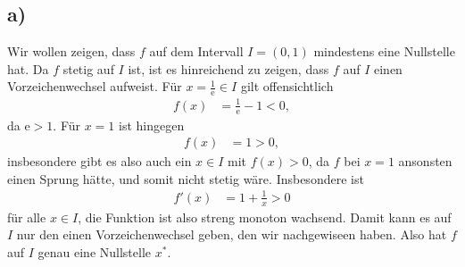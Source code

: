 \documentclass[english, parskip=full]{scrartcl}
\newcommand{\e}{\text{e}}
\begin{document}
\subsection*{a)}
Wir wollen zeigen, dass $f$ auf dem Intervall $I=(0,1)$ mindestens eine Nullstelle hat.
Da $f$ stetig auf $I$ ist, ist es hinreichend zu zeigen, dass $f$ auf $I$ einen Vorzeichenwechsel aufweist.
Für $x=\frac{1}{\e} \in I$ gilt offensichtlich 
\begin{align}
f(x) &= \frac{1}{\e} - 1 < 0,
\end{align}
da $\e > 1$. 
Für $x=1$ ist hingegen
\begin{align}
f(x) &= 1 > 0,
\end{align}
insbesondere gibt es also auch ein $x\in I$ mit $f(x) > 0$, da $f$ bei $x=1$ ansonsten einen Sprung hätte, und somit nicht stetig wäre.
Insbesondere ist
\begin{align}
f'(x) &= 1 + \frac{1}{x} > 0
\end{align}
für alle $x\in I$, die Funktion ist also streng monoton wachsend.
Damit kann es auf $I$ nur den einen Vorzeichenwechsel geben, den wir nachgewiseen haben.
Also hat $f$ auf $I$ genau eine Nullstelle $x^\ast$.
\end{document}
